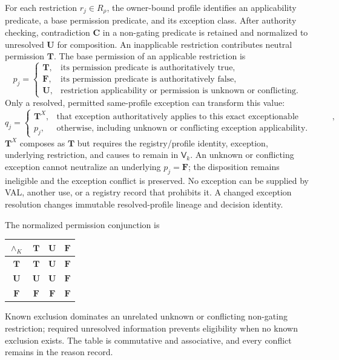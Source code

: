 For each restriction $r_j\in R_\rho$, the owner-bound profile identifies an
applicability predicate, a base permission predicate, and its exception class.
After authority checking, contradiction $\mathbf C$ in a non-gating predicate
is retained and normalized to unresolved $\mathbf U$ for composition. An
inapplicable restriction contributes neutral permission $\mathbf T$. The base
permission of an applicable restriction is
\[
 p_j=\begin{cases}
 \mathbf T, & \text{its permission predicate is authoritatively true},\\
 \mathbf F, & \text{its permission predicate is authoritatively false},\\
 \mathbf U, & \text{restriction applicability or permission is unknown or
                         conflicting}.
 \end{cases}
\]
Only a resolved, permitted same-profile exception can transform this value:
\[
 q_j=\begin{cases}
 \mathbf T^{X}, & \text{that exception authoritatively applies to this exact
                         exceptionable restriction},\\
 p_j, & \text{otherwise, including unknown or conflicting exception
                         applicability}.
 \end{cases}
\]
$\mathbf T^X$ composes as $\mathbf T$ but requires the registry/profile
identity, exception, underlying restriction, and causes to remain in
$\mathsf V_k$. An unknown or conflicting exception cannot neutralize an
underlying $p_j=\mathbf F$; the disposition remains ineligible and the
exception conflict is preserved. No exception can be supplied by VAL,
another use, or a registry record that prohibits it. A changed exception
resolution changes immutable resolved-profile lineage and decision identity.

The normalized permission conjunction is
\begin{center}
\begin{tabular}{c|ccc}
$\wedge_K$ & $\mathbf T$ & $\mathbf U$ & $\mathbf F$ \\
\hline
$\mathbf T$ & $\mathbf T$ & $\mathbf U$ & $\mathbf F$ \\
$\mathbf U$ & $\mathbf U$ & $\mathbf U$ & $\mathbf F$ \\
$\mathbf F$ & $\mathbf F$ & $\mathbf F$ & $\mathbf F$ \\
\end{tabular}
\end{center}
Known exclusion dominates an unrelated unknown or conflicting non-gating
restriction; required unresolved information prevents eligibility when no
known exclusion exists. The table is commutative and associative, and every
conflict remains in the reason record.

